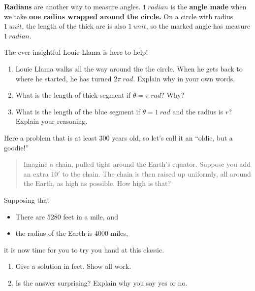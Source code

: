 \documentclass[noauthor,nooutcomes,handout]{ximera}
\begin{document}
\begin{question}
\textbf{Radians} are another way to measure angles. $1 \ radian$ is
the \textbf{angle made} when we take \textbf{one radius wrapped around the
circle.} On a circle with radius $1\ unit$, the length of the thick arc
is also $1\ unit$, so the marked angle has measure $1 \ radian$.


\begin{center}
 
\end{center}

The ever insightful Louie Llama is here to help!

\begin{enumerate}
    \item Louie Llama walks all the way around the  the circle. When he gets back to where he started, he has turned $2\pi \ rad$. Explain why in your own words. 
    \item What is the length of thick segment if $\theta=\pi \ rad$? Why?
    \item What is the length of the blue segment if $\theta=1 \ rad$ and the radius is $r$? Explain your reasoning.
\end{enumerate}
\end{question}
\mynewpage

\begin{question}
  Here a problem that is at least $300$ years old, so let's call it an  ``oldie, but a goodie!''
  \begin{quote}
    Imagine a chain, pulled tight around the Earth's equator. Suppose
   you add an extra $10'$ to the chain. The chain is then raised up
    uniformly, all around the Earth, as high as possible. How high is    that?
  \end{quote}
  Supposing that
  \begin{itemize}
  \item There are $5280$ feet in a mile, and
  \item the radius of the Earth is $4000$ miles,
  \end{itemize}
  it is now time for you to try you hand at this classic.
  \begin{enumerate}
  \item Give a solution in feet. Show all work.
  \item Is the answer surprising? Explain why you say yes or no.
  \end{enumerate}
\end{question}
\end{document}
